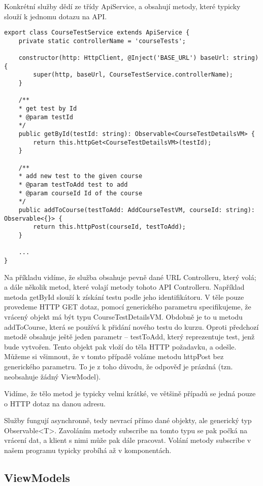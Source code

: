 Konkrétní služby dědí ze třídy ApiService, a obsahují metody, které typicky slouží k jednomu dotazu na API.

\begin{lstlisting}
export class CourseTestService extends ApiService {
	private static controllerName = 'courseTests';
	
	constructor(http: HttpClient, @Inject('BASE_URL') baseUrl: string) {
		super(http, baseUrl, CourseTestService.controllerName);
	}
	
	/**
	* get test by Id
	* @param testId
	*/
	public getById(testId: string): Observable<CourseTestDetailsVM> {
		return this.httpGet<CourseTestDetailsVM>(testId);
	}
	
	/**
	* add new test to the given course
	* @param testToAdd test to add
	* @param courseId Id of the course
	*/
	public addToCourse(testToAdd: AddCourseTestVM, courseId: string): Observable<{}> {
		return this.httpPost(courseId, testToAdd);
	}
	
	...
}
\end{lstlisting}

Na příkladu vidíme, že služba obsahuje pevně dané URL Controlleru, který volá; a dále několik metod, které volají metody tohoto API Controlleru.
Například metoda getById slouží k získání testu podle jeho identifikátoru. V těle pouze provedeme HTTP GET dotaz, pomocí generického parametru specifikujeme, že vrácený objekt má být typu CourseTestDetailsVM. 
Obdobně je to u metodu addToCourse, která se používá k přidání nového testu do kurzu. Oproti předchozí metodě obsahuje ještě jeden parametr -- testToAdd, který reprezentuje test, jenž bude vytvořen. Tento objekt pak vloží do těla HTTP požadavku, a odešle. 
Můžeme si všimnout, že v tomto případě voláme metodu httpPost bez generického parametru. To je z toho důvodu, že odpověď je prázdná (tzn. neobsahuje žádný ViewModel).

Vidíme, že tělo metod je typicky velmi krátké, ve většině případů se jedná pouze o HTTP dotaz na danou adresu.

Služby fungují asynchronně, tedy nevrací přímo dané objekty, ale generický typ Observable<T>. Zavoláním metody subscribe na tomto typu se pak počká na vrácení dat, a klient s nimi může pak dále pracovat.
Volání metody subscribe v našem programu typicky probíhá až v komponentách.

\newpage

\subsection{ViewModels}

